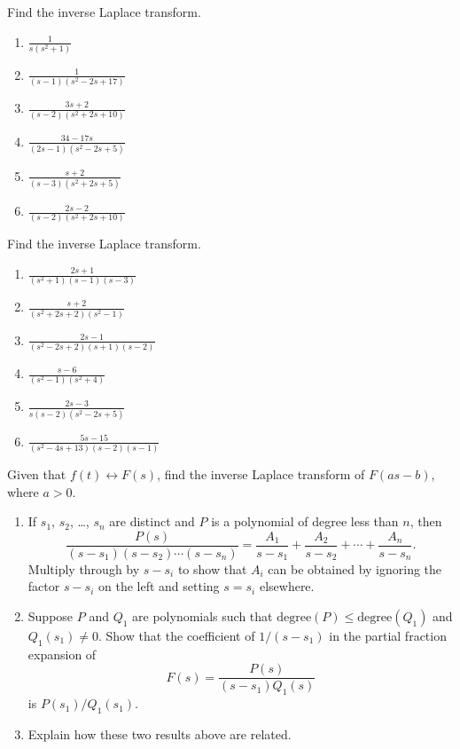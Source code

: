 \documentclass{ximera}
\begin{document}
\begin{problem}\label{exer:8.2.7}
Find the inverse Laplace transform.

\begin{enumerate}
    \item $\frac{1}{s(s^2+1)}$
    \item $\frac{1}{(s-1)(s^2-2s+17)}$
    \item $\frac{3s+2}{(s-2)(s^2+2s+10)}$
    \item $\frac{34-17s}{(2s-1)(s^2-2s+5)}$
    \item $\frac{s+2}{(s-3)(s^2+2s+5)}$
    \item $\frac{2s-2}{(s-2)(s^2+2s+10)}$
\end{enumerate}
\end{problem}

\begin{problem}\label{exer:8.2.8}
 Find the inverse Laplace transform.
\begin{enumerate}
    \item $\frac{2s+1}{(s^2+1)(s-1)(s-3)}$
    \item $\frac{s+2}{(s^2+2s+2)(s^2-1)}$
    \item $\frac{2s-1}{(s^2-2s+2)(s+1)(s-2)}$
    \item $\frac{s-6}{(s^2-1)(s^2+4)}$
    \item $\frac{2s-3}{s(s-2)(s^2-2s+5)}$
    \item $\frac{5s-15}{(s^2-4s+13)(s-2)(s-1)}$
\end{enumerate}
\end{problem}

\begin{problem}\label{exer:8.2.9}
 Given that $f(t)\leftrightarrow F(s)$, find the inverse
Laplace transform of $F(as-b)$, where $a>0$.
\end{problem}

\begin{problem}\label{exer:8.2.10}
\begin{enumerate}
\item  %
If $s_1$, $s_2$, \dots, $s_n$ are distinct and $P$ is a polynomial of
degree less than $n$, then
$$
\frac{P(s)}{(s-s_1)(s-s_2)\cdots(s-s_n)}=
\frac{A_1}{s-s_1}+\frac{A_2}{s-s_2}+\cdots+\frac{A_n}{s-s_n}.
$$
Multiply through by $s-s_i$ to show that
 $A_i$ can be obtained by ignoring the factor $s-s_i$ on the
left and setting $s=s_i$ elsewhere.
\item %
Suppose $P$ and $Q_1$ are polynomials such that
$\text{degree}(P)\le\text{degree}(Q_1)$ and $Q_1(s_1)\ne0$.
Show that the coefficient of $1/(s-s_1)$ in the partial fraction
expansion of
$$
F(s)=\frac{P(s)}{(s-s_1)Q_1(s)}
$$
is $P(s_1)/Q_1(s_1)$.
\item %
Explain how these two results above are related.
\end{enumerate}
\end{problem}
\end{document}
